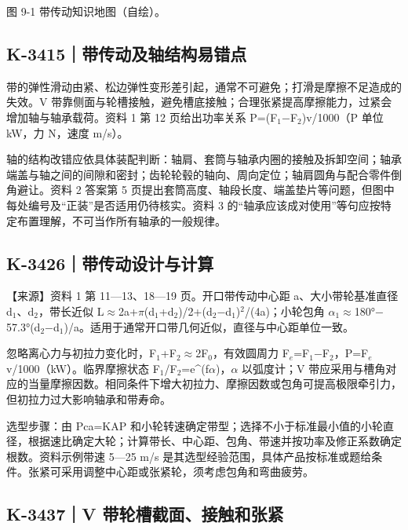 \documentclass[zihao=5,a4paper,UTF8,fontset=fandol]{ctexart}
\begin{document}
图 9-1 带传动知识地图（自绘）。





\subsection{K-3415｜带传动及轴结构易错点}
\label{k-3415}

带的弹性滑动由紧、松边弹性变形差引起，通常不可避免；打滑是摩擦不足造成的失效。V 带靠侧面与轮槽接触，避免槽底接触；合理张紧提高摩擦能力，过紧会增加轴与轴承载荷。资料 1 第 12 页给出功率关系 P=(F$_{1}$$-$F$_{2}$)v/1000（P 单位 kW，力 N，速度 m/s）。


轴的结构改错应依具体装配判断：轴肩、套筒与轴承内圈的接触及拆卸空间；轴承端盖与轴之间的间隙和密封；齿轮轮毂的轴向、周向定位；轴肩圆角与配合零件倒角避让。资料 2 答案第 5 页提出套筒高度、轴段长度、端盖垫片等问题，但图中每处编号及“正装”是否适用仍待核实。资料 3 的“轴承应该成对使用”等句应按特定布置理解，不可当作所有轴承的一般规律。





\subsection{K-3426｜带传动设计与计算}
\label{k-3426}

【来源】资料 1 第 11—13、18—19 页。开口带传动中心距 a、大小带轮基准直径 d$_{1}$、d$_{2}$，带长近似 L$\approx$2a+$\pi$(d$_{1}$+d$_{2}$)/2+(d$_{2}$$-$d$_{1}$)$^{2}$/(4a)；小轮包角 $\alpha$$_{1}$$\approx$180°$-$57.3°(d$_{2}$$-$d$_{1}$)/a。适用于通常开口带几何近似，直径与中心距单位一致。


忽略离心力与初拉力变化时，F$_{1}$+F$_{2}$$\approx$2F$_{0}$，有效圆周力 F$_{e}$=F$_{1}$$-$F$_{2}$，P=F$_{e}$v/1000（kW）。临界摩擦状态 F$_{1}$/F$_{2}$=e\textasciicircum{}(f$\alpha$)，$\alpha$ 以弧度计；V 带应采用与槽角对应的当量摩擦因数。相同条件下增大初拉力、摩擦因数或包角可提高极限牵引力，但初拉力过大影响轴承和带寿命。


选型步骤：由 Pca=KAP 和小轮转速确定带型；选择不小于标准最小值的小轮直径，根据速比确定大轮；计算带长、中心距、包角、带速并按功率及修正系数确定根数。资料示例带速 5—25 m/s 是其选型经验范围，具体产品按标准或题给条件。张紧可采用调整中心距或张紧轮，须考虑包角和弯曲疲劳。





\subsection{K-3437｜V 带轮槽截面、接触和张紧}
\label{k-3437}
\end{document}
